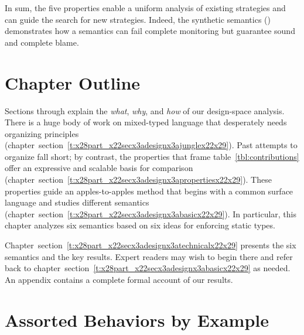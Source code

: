 \documentclass[ twoside,open=right,titlepage,numbers=noenddot,headinclude,%
                footinclude=true,cleardoublepage=empty,abstract=off,
                BCOR=5mm,paper=a4,fontsize=11pt,%
                ngerman,american,%
                parts,pdfspacing]{scrreprt}
\newcommand{\SecRef}[2]{section~#1}
\newcommand{\SecRefLocal}[3]{\hyperref[#1]{\SecRef{#2}{#3}}}
\let\SOriginalthesubsubsection\thesubsubsection
\newcommand{\Ssubsection}[2]{\subsection[#1]{#2}\let\thesubsubsection\SOriginalthesubsubsection}
\renewcommand{\Ssubsection}[2]{\section[#1]{#2}}
\renewcommand{\SecRefLocal}[3]{section~\ref{#1}}
\begin{document}
In sum, the five properties enable a uniform analysis of existing strategies
 and can guide the search for new strategies. Indeed, the synthetic
 \relax{\aname} semantics (\relax{$\ascr$}) demonstrates how a semantics can
 fail complete monitoring but guarantee sound and complete blame.

\Ssubsection{Chapter Outline}{Chapter Outline}\label{t:x28part_x22Chapterx5fOutlinex22x29}

Sections \relax{\ref{sec:design:jungle}} through \relax{\ref{sec:design:basic}} explain the
 \emph{what}, \emph{why}, and \emph{how} of our design{-}space analysis.
There is a huge body of work on mixed{-}typed language that desperately
 needs organizing principles (chapter~\SecRefLocal{t:x28part_x22secx3adesignx3ajunglex22x29}{4.2}{Assorted Behaviors by Example}).
Past attempts to organize fall short; by contrast,
 the properties that frame table~\ref{tbl:contributions} offer an expressive and scalable
 basis for comparison (chapter~\SecRefLocal{t:x28part_x22secx3adesignx3apropertiesx22x29}{4.3}{Towards a Formal Comparison}).
These properties guide an apples{-}to{-}apples method that begins
 with a common surface language and studies different semantics (chapter~\SecRefLocal{t:x28part_x22secx3adesignx3abasicx22x29}{4.4}{Evaluation Framework}).
In particular, this chapter analyzes six semantics based on six ideas for
 enforcing static types.

Chapter~\SecRefLocal{t:x28part_x22secx3adesignx3atechnicalx22x29}{4.5}{Technical Development} presents the six semantics and the key results.
Expert readers may wish to begin there and refer back to chapter~\SecRefLocal{t:x28part_x22secx3adesignx3abasicx22x29}{4.4}{Evaluation Framework}
 as needed.
An appendix contains a complete formal account of our results.

\Ssubsection{Assorted Behaviors by Example}{Assorted Behaviors by Example}\label{t:x28part_x22secx3adesignx3alandscapex22x29}

\label{t:x28part_x22secx3adesignx3ajunglex22x29}

\label{sec:design:jungle}
\end{document}
